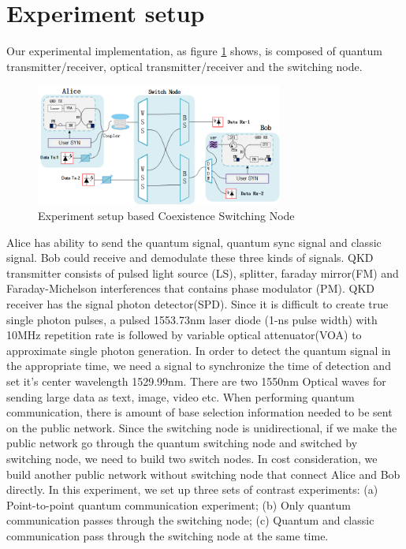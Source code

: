 \documentclass[letterpaper,10pt]{article}
\begin{document}
\section{Experiment setup}
Our experimental implementation, as figure \ref{Fig:experiment_of_switching_node} shows, is composed of quantum transmitter/receiver, optical transmitter/receiver and the switching node.
\begin{figure}
 \centering
 \includegraphics[height= 4cm,width=.6\linewidth]{experiment_of_switching_node}
 \caption{Experiment setup based Coexistence Switching Node}
 \label{Fig:experiment_of_switching_node}
\end{figure}
Alice has ability to send the quantum signal, quantum sync signal and classic signal. Bob could receive and demodulate these three kinds of signals. QKD transmitter consists of pulsed light source (LS), splitter, faraday mirror(FM) and Faraday-Michelson interferences that contains phase modulator (PM). QKD receiver has the signal photon detector(SPD). Since it is difficult to create true single photon pulses, a pulsed 1553.73nm laser diode (1-ns pulse width) with 10MHz repetition rate is followed by variable optical attenuator(VOA) to approximate single photon generation. In order to detect the quantum signal in the appropriate time, we need a signal to synchronize the time of detection and set it's center wavelength 1529.99nm. There are two 1550nm Optical waves for sending large data as text, image, video etc. When performing quantum communication, there is amount of base selection information needed to be sent on the public network. Since the switching node is unidirectional, if we make the public network go through the quantum switching node and switched by switching node, we need to build two switch nodes. In cost consideration, we build another public network without switching node that connect Alice and Bob directly. In this experiment, we set up three sets of contrast experiments: (a) Point-to-point quantum communication experiment; (b) Only quantum communication passes through the switching node; (c) Quantum and classic communication pass through the switching node at the same time.
\end{document}
